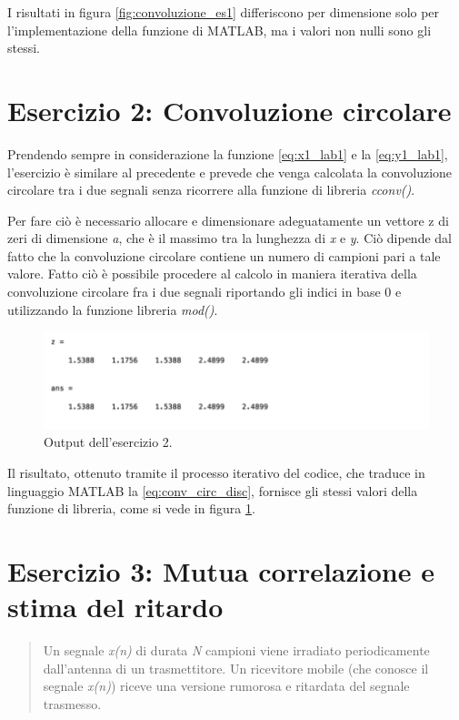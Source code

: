 I risultati in figura \ref{fig:convoluzione_es1} differiscono per dimensione solo per l'implementazione della funzione di MATLAB, ma i valori non nulli sono gli stessi.

\section{Esercizio 2: Convoluzione circolare}
Prendendo sempre in considerazione la funzione \ref{eq:x1_lab1} e la \ref{eq:y1_lab1}, l'esercizio è similare al precedente e prevede che venga calcolata la convoluzione circolare tra i due segnali senza ricorrere alla funzione di libreria \textit{cconv()}.
\par
Per fare ciò è necessario allocare e dimensionare adeguatamente un vettore z di zeri di dimensione \textit{a}, che è il massimo tra la lunghezza di \textit{x} e \textit{y}. Ciò dipende dal fatto che la convoluzione circolare contiene un numero di campioni pari a tale valore. Fatto ciò è possibile procedere al calcolo in maniera iterativa della convoluzione circolare fra i due segnali riportando gli indici in base 0 e utilizzando la funzione libreria \textit{mod()}.

\begin{figure}[H]
\centering
\includegraphics[width=\textwidth]{./images/cap2/convoluzione_es2.png}
\caption{Output dell'esercizio 2.}
\label{fig:convoluzione_es2}
\end{figure}

Il risultato, ottenuto tramite il processo iterativo del codice, che traduce in linguaggio MATLAB la \ref{eq:conv_circ_disc}, fornisce gli stessi valori della funzione di libreria, come si vede in figura \ref{fig:convoluzione_es2}.

\section{Esercizio 3: Mutua correlazione e stima del ritardo}
\begin{quote}
	Un segnale \textit{x(n)} di durata \textit{N} campioni viene irradiato periodicamente dall'antenna di un trasmettitore. Un ricevitore mobile (che conosce il segnale \textit{x(n)}) riceve una versione rumorosa e ritardata del segnale trasmesso.
\end{quote}

